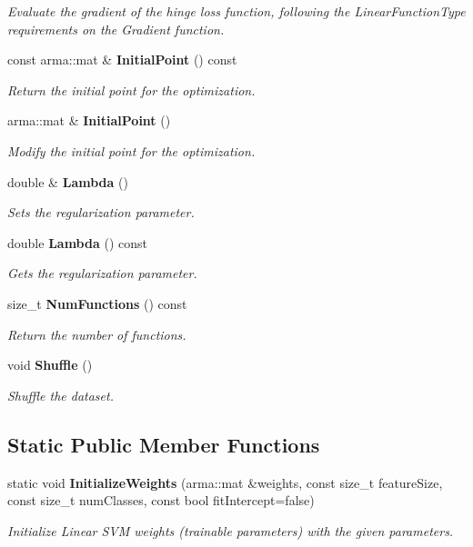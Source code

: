 \begin{DoxyCompactItemize}
\begin{DoxyCompactList}\small\item\em Evaluate the gradient of the hinge loss function, following the Linear\+Function\+Type requirements on the Gradient function. \end{DoxyCompactList}\item 
const arma\+::mat \& \textbf{ Initial\+Point} () const
\begin{DoxyCompactList}\small\item\em Return the initial point for the optimization. \end{DoxyCompactList}\item 
arma\+::mat \& \textbf{ Initial\+Point} ()
\begin{DoxyCompactList}\small\item\em Modify the initial point for the optimization. \end{DoxyCompactList}\item 
double \& \textbf{ Lambda} ()
\begin{DoxyCompactList}\small\item\em Sets the regularization parameter. \end{DoxyCompactList}\item 
double \textbf{ Lambda} () const
\begin{DoxyCompactList}\small\item\em Gets the regularization parameter. \end{DoxyCompactList}\item 
size\+\_\+t \textbf{ Num\+Functions} () const
\begin{DoxyCompactList}\small\item\em Return the number of functions. \end{DoxyCompactList}\item 
void \textbf{ Shuffle} ()
\begin{DoxyCompactList}\small\item\em Shuffle the dataset. \end{DoxyCompactList}\end{DoxyCompactItemize}
\subsection*{Static Public Member Functions}
\begin{DoxyCompactItemize}
\item 
static void \textbf{ Initialize\+Weights} (arma\+::mat \&weights, const size\+\_\+t feature\+Size, const size\+\_\+t num\+Classes, const bool fit\+Intercept=false)
\begin{DoxyCompactList}\small\item\em Initialize Linear S\+VM weights (trainable parameters) with the given parameters. \end{DoxyCompactList}\end{DoxyCompactItemize}


